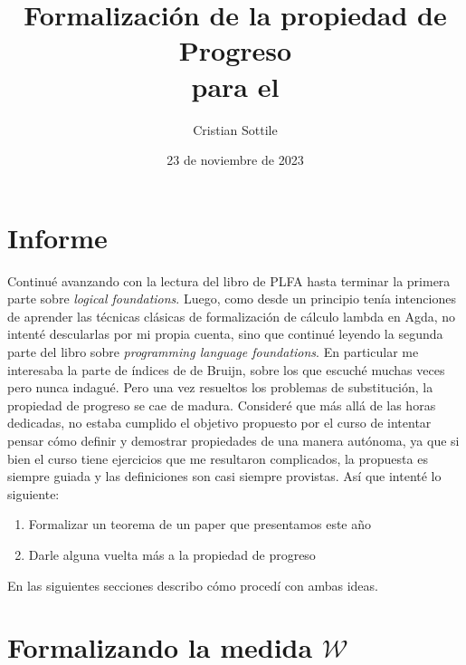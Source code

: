 \documentclass{article}
\title{Formalización de la propiedad de Progreso\\para el \stlcw}
\author{Cristian Sottile}
\date{23 de noviembre de 2023}
\newcommand{\stlcw}{$\lambda-$cálculo simplemente tipado\xspace}
\begin{document}
\maketitle


\section{Informe}

Continué avanzando con la lectura del libro de PLFA hasta terminar la primera parte sobre {\em logical foundations}. Luego, como desde un principio tenía intenciones de aprender las técnicas clásicas de formalización de cálculo lambda en Agda, no intenté descularlas por mi propia cuenta, sino que continué leyendo la segunda parte del libro sobre {\em programming language foundations}. En particular me interesaba la parte de índices de de Bruijn, sobre los que escuché muchas veces pero nunca indagué. Pero una vez resueltos los problemas de substitución, la propiedad de progreso se cae de madura. Consideré que más allá de las horas dedicadas, no estaba cumplido el objetivo propuesto por el curso de intentar pensar cómo definir y demostrar propiedades de una manera autónoma, ya que si bien el curso tiene ejercicios que me resultaron complicados, la propuesta es siempre guiada y las definiciones son casi siempre provistas. Así que intenté lo siguiente:

\begin{enumerate}
\item Formalizar un teorema de un paper que presentamos este año
\item Darle alguna vuelta más a la propiedad de progreso
\end{enumerate}

En las siguientes secciones describo cómo procedí con ambas ideas.

\section{Formalizando la medida $\mathcal{W}$}
\end{document}
